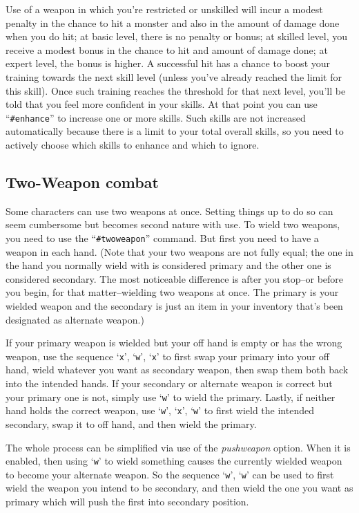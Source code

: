 Use of a weapon in which you're restricted or unskilled
will incur a modest penalty in the chance to hit a monster and also in
the amount of damage done when you do hit; at basic level, there is no
penalty or bonus; at skilled level, you receive a modest bonus in the
chance to hit and amount of damage done; at expert level, the bonus is
higher.  A successful hit has a chance to boost your training towards
the next skill level (unless you've already reached the limit for this
skill).  Once such training reaches the threshold for that next level,
you'll be told that you feel more confident in your skills.  At that
point you can use ``{\tt \#enhance}'' to increase one or more skills.
Such skills
are not increased automatically because there is a limit to your total
overall skills, so you need to actively choose which skills to enhance
and which to ignore.

\subsection*{Two-Weapon combat}

Some characters can use two weapons at once.  Setting things up to
do so can seem cumbersome but becomes second nature with use.
To wield two weapons, you need to use the ``{\tt \#twoweapon}'' command.
But first you need to have a weapon in each hand.
(Note that your two weapons are not fully equal; the one in the
hand you normally wield with is considered primary and the other
one is considered secondary.  The most noticeable difference is
after you stop--or before you begin, for that matter--wielding
two weapons at once.  The primary is your wielded weapon and the
secondary is just an item in your inventory that's been designated
as alternate weapon.)

If your primary weapon is wielded but your off hand is empty or has
the wrong weapon, use the sequence `{\tt x}', `{\tt w}', `{\tt x}' to
first swap your
primary into your off hand, wield whatever you want as secondary
weapon, then swap them both back into the intended hands.
If your secondary or alternate weapon is correct but your primary
one is not, simply use `{\tt w}' to wield the primary.
Lastly, if neither hand holds the correct weapon,
use `{\tt w}', `{\tt x}', `{\tt w}'
to first wield the intended secondary, swap it to off hand, and then
wield the primary.

The whole process can be simplified via use of the
{\it pushweapon\/}
option.  When it is enabled, then using `{\tt w}' to wield something
causes the currently wielded weapon to become your alternate weapon.
So the sequence `{\tt w}', `{\tt w}' can be used to first wield the weapon you
intend to be secondary, and then wield the one you want as primary
which will push the first into secondary position.

